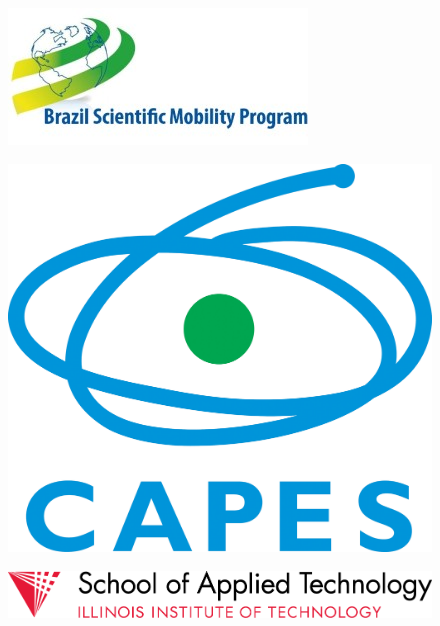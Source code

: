 \documentclass[a4paper,11pt]{article}
\begin{document}
\begin{figure}[H]
\centering
\includegraphics[width = 0.5\linewidth]{images/bsmp_logo.jpg}
\label{bsmp}
\end{figure}

\begin{figure}[H]
\centering
\includegraphics[width = 0.3\linewidth]{images/logo_capes_transparente.png}
\label{capes}
\end{figure}

\medskip    

\begin{figure}[H]
\centering
\includegraphics[width = 1.0\linewidth]{images/IIT_SAT_horiz_186_blk.png}
\label{iittech}
\end{figure}

\newpage
\end{document}
